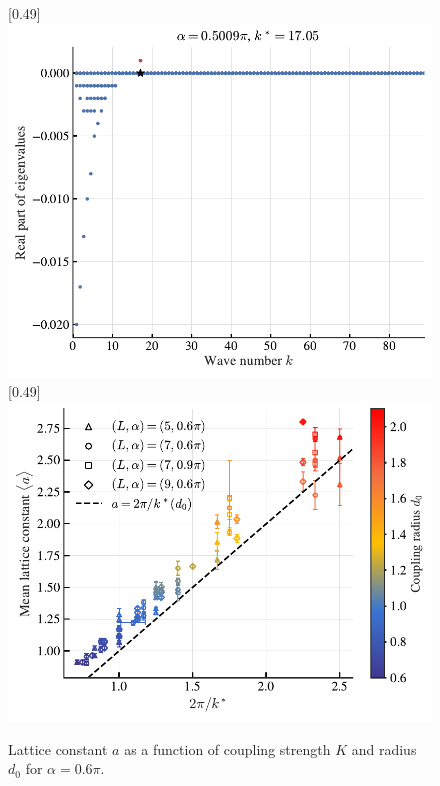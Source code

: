 \documentclass{article}
\begin{document}
\begin{figure}[H]
    \centering
    [0.49\linewidth]{
        \includegraphics[width=\linewidth]{./figs/continuous_spectrum.pdf}
    }
    \hfill
    [0.49\linewidth]{
        \includegraphics[width=\linewidth]{./figs/lattice_constant_vs_kstar_discrete.pdf}
    }
    \caption{
        Lattice constant $a$ as a function of coupling strength $K$ and radius $d_0$ for $\alpha=0.6\pi$.
    }
\end{figure}
\end{document}

